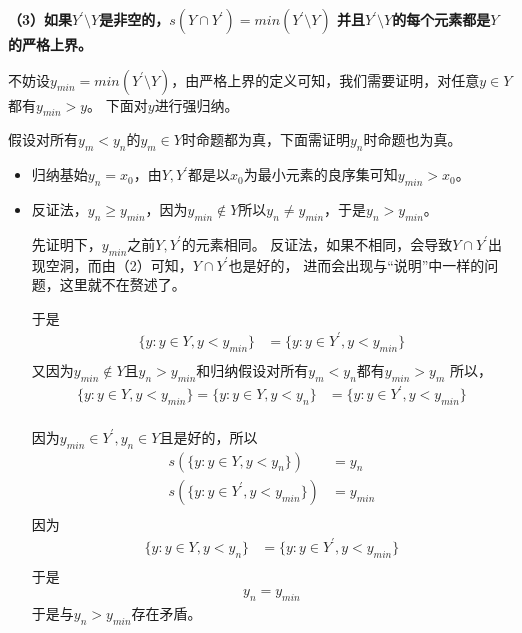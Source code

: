\documentclass{article}
\begin{document}
\textbf{（3）如果$Y^\prime \setminus Y$是非空的，$s(Y \cap Y^\prime) = min(Y^\prime \setminus Y )$
  并且$Y^\prime \setminus Y$的每个元素都是$Y$的严格上界。}

不妨设$y_{min}=min(Y^\prime \setminus Y)$，由严格上界的定义可知，我们需要证明，对任意$y \in Y$都有$y_{min} > y$。
下面对$y$进行强归纳。

假设对所有$y_m < y_n$的$y_m \in Y$时命题都为真，下面需证明$y_n$时命题也为真。

\begin{itemize}
  \item 归纳基始$y_n = x_0$，由$Y,Y^\prime$都是以$x_0$为最小元素的良序集可知$y_{min} > x_0$。
  \item  反证法，$y_n \geq y_{min}$，因为$y_{min} \not \in Y$所以$y_n \neq y_{min}$，于是$y_n > y_{min}$。

        先证明下，$y_{min}$之前$Y, Y^\prime$的元素相同。
        反证法，如果不相同，会导致$Y \cap Y^\prime$出现空洞，而由（2）可知，$Y \cap Y^\prime$也是好的，
        进而会出现与“说明”中一样的问题，这里就不在赘述了。

        于是
        \begin{align*}
          \{ y : y \in Y, y < y_{min}\} & = \{ y : y \in Y^\prime, y < y_{min} \} \\
        \end{align*}
        又因为$y_{min} \not \in Y$且$y_n > y_{min}$和归纳假设对所有$y_m < y_n$都有$y_{min} > y_m $
        所以，
        \begin{align*}
          \{ y : y \in Y, y < y_{min}\} = \{ y : y \in Y, y < y_{n}\} & = \{ y : y \in Y^\prime, y < y_{min} \} \\
        \end{align*}

        因为$y_{min} \in Y^\prime, y_n \in Y$且是好的，所以
        \begin{align*}
          s(\{ y : y \in Y, y < y_n\})            & = y_n     \\
          s(\{ y : y \in Y^\prime, y < y_{min}\}) & = y_{min} \\
        \end{align*}
        因为
        \begin{align*}
          \{ y : y \in Y, y < y_{n}\} & = \{ y : y \in Y^\prime, y < y_{min} \} \\
        \end{align*}
        于是
        \begin{align*}
          y_n = y_{min}
        \end{align*}
        于是与$y_n > y_{min}$存在矛盾。
\end{itemize}
\end{document}
